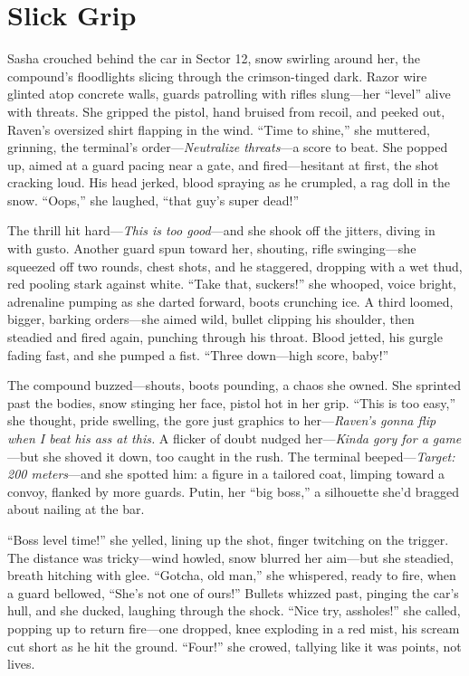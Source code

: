 \documentclass[12pt]{book}
\begin{document}
\section{Slick Grip}

Sasha crouched behind the car in Sector 12, snow swirling around her, the compound’s floodlights slicing through the crimson-tinged dark. Razor wire glinted atop concrete walls, guards patrolling with rifles slung—her “level” alive with threats. She gripped the pistol, hand bruised from recoil, and peeked out, Raven’s oversized shirt flapping in the wind. “Time to shine,” she muttered, grinning, the terminal’s order—\textit{Neutralize threats}—a score to beat. She popped up, aimed at a guard pacing near a gate, and fired—hesitant at first, the shot cracking loud. His head jerked, blood spraying as he crumpled, a rag doll in the snow. “Oops,” she laughed, “that guy’s super dead!”

The thrill hit hard—\textit{This is too good}—and she shook off the jitters, diving in with gusto. Another guard spun toward her, shouting, rifle swinging—she squeezed off two rounds, chest shots, and he staggered, dropping with a wet thud, red pooling stark against white. “Take that, suckers!” she whooped, voice bright, adrenaline pumping as she darted forward, boots crunching ice. A third loomed, bigger, barking orders—she aimed wild, bullet clipping his shoulder, then steadied and fired again, punching through his throat. Blood jetted, his gurgle fading fast, and she pumped a fist. “Three down—high score, baby!”

The compound buzzed—shouts, boots pounding, a chaos she owned. She sprinted past the bodies, snow stinging her face, pistol hot in her grip. “This is too easy,” she thought, pride swelling, the gore just graphics to her—\textit{Raven’s gonna flip when I beat his ass at this.} A flicker of doubt nudged her—\textit{Kinda gory for a game}—but she shoved it down, too caught in the rush. The terminal beeped—\textit{Target: 200 meters}—and she spotted him: a figure in a tailored coat, limping toward a convoy, flanked by more guards. Putin, her “big boss,” a silhouette she’d bragged about nailing at the bar.

“Boss level time!” she yelled, lining up the shot, finger twitching on the trigger. The distance was tricky—wind howled, snow blurred her aim—but she steadied, breath hitching with glee. “Gotcha, old man,” she whispered, ready to fire, when a guard bellowed, “She’s not one of ours!” Bullets whizzed past, pinging the car’s hull, and she ducked, laughing through the shock. “Nice try, assholes!” she called, popping up to return fire—one dropped, knee exploding in a red mist, his scream cut short as he hit the ground. “Four!” she crowed, tallying like it was points, not lives.
\end{document}
